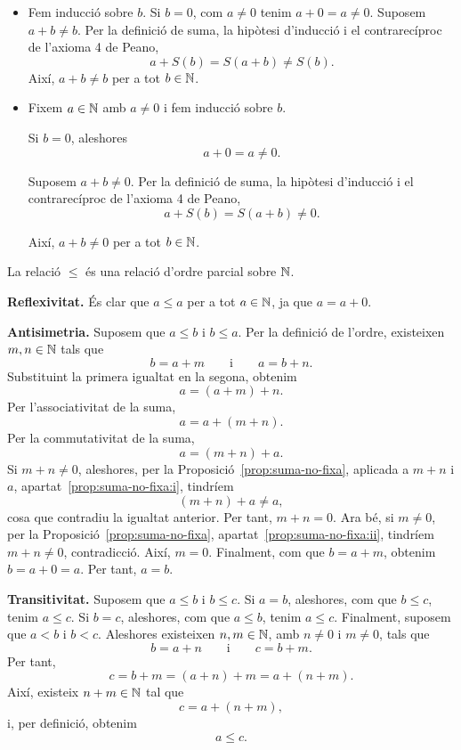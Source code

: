 \begin{prova}
\begin{itemize}
  \item[\textbf{(i)}] Fem inducció sobre $b$. Si $b=0$, com $a\neq 0$ tenim $a+0=a\neq 0$. Suposem $a+b\neq b$. Per la definició de suma, la hipòtesi d'inducció i el contrarecíproc de l'axioma 4 de Peano,
\[
a+S(b)=S(a+b)\neq S(b).
\]
Així, $a+b\neq b$ per a tot $b\in \mathbb{N}$.
  \item[\textbf{(ii)}] Fixem $a\in\mathbb{N}$ amb $a\neq 0$ i fem inducció sobre $b$.

Si $b=0$, aleshores
\[
a+0=a\neq 0.
\]

Suposem $a+b\neq 0$. Per la definició de suma, la hipòtesi d'inducció i el contrarecíproc de l'axioma 4 de Peano, 
\[
a+S(b)=S(a+b)\neq 0.
\]

Així, $a+b\neq 0$ per a tot $b\in\mathbb{N}$.
\end{itemize}
\end{prova}

\begin{proposicio}
La relació $\leq$ és una relació d'ordre parcial sobre $\mathbb{N}$.
\end{proposicio}

\begin{prova}
\textbf{Reflexivitat.} És clar que $a\leq a$ per a tot $a\in \mathbb{N}$, ja que $a=a+0$.

\textbf{Antisimetria.} Suposem que $a\leq b$ i $b\leq a$. Per la definició de l'ordre, existeixen $m,n\in\mathbb{N}$ tals que 
\[ 
b=a+m \qquad\text{i}\qquad a=b+n. 
\] 
Substituint la primera igualtat en la segona, obtenim 
\[ 
a=(a+m)+n. 
\] 
Per l'associativitat de la suma, 
\[ a=a+(m+n). 
\] 
Per la commutativitat de la suma, 
\[ a=(m+n)+a. 
\] 
Si $m+n\neq 0$, aleshores, per la Proposició~\ref{prop:suma-no-fixa}, aplicada a $m+n$ i $a$, apartat~\ref{prop:suma-no-fixa:i}, tindríem 
\[ 
(m+n)+a\neq a, 
\] 
cosa que contradiu la igualtat anterior. Per tant, $m+n=0$. Ara bé, si $m\neq 0$, per la Proposició~\ref{prop:suma-no-fixa}, apartat~\ref{prop:suma-no-fixa:ii}, tindríem $m+n\neq 0$, contradicció. Així, $m=0$. Finalment, com que $b=a+m$, obtenim $b=a+0=a$. Per tant, $a=b$.

\textbf{Transitivitat.} Suposem que $a\leq b$ i $b\leq c$. Si $a=b$, aleshores, com que $b\leq c$, tenim $a\leq c$. Si $b=c$, aleshores, com que $a\leq b$, tenim $a\leq c$. Finalment, suposem que $a<b$ i $b<c$. Aleshores existeixen $n,m\in\mathbb{N}$, amb $n\neq 0$ i $m\neq 0$, tals que
\[
b=a+n
\qquad\text{i}\qquad
c=b+m.
\]
Per tant,
\[
c=b+m=(a+n)+m=a+(n+m).
\]
Així, existeix $n+m\in\mathbb{N}$ tal que
\[
c=a+(n+m),
\]
i, per definició, obtenim
\[
a\leq c.
\]
\end{prova}

